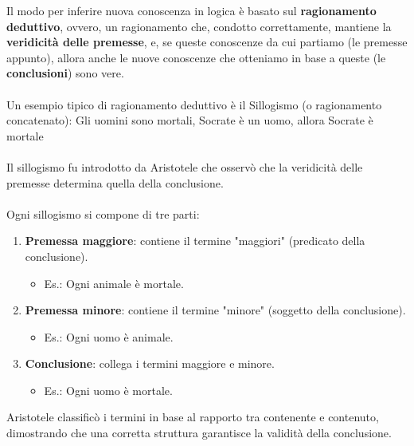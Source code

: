 \documentclass[../main.tex]{subfiles}
\begin{document}
	Il modo per inferire nuova conoscenza in logica è basato sul \textbf{ragionamento deduttivo}, ovvero, un ragionamento che, condotto correttamente, mantiene la \textbf{veridicità delle premesse}, e, se queste conoscenze da cui partiamo (le premesse appunto), allora anche le nuove conoscenze che otteniamo in base a queste (le \textbf{conclusioni}) sono vere.\\\\
	Un esempio tipico di ragionamento deduttivo è il Sillogismo (o ragionamento concatenato): Gli uomini sono mortali, Socrate è un uomo, allora Socrate è mortale\\\\
	Il sillogismo fu introdotto da Aristotele che osservò che la veridicità delle premesse determina quella della conclusione.\\\\
	Ogni sillogismo si compone di tre parti:
	\begin{enumerate}
		\item \textbf{Premessa maggiore}: contiene il termine "maggiori" (predicato della conclusione).
		\begin{itemize}
			\item Es.: Ogni animale è mortale.
		\end{itemize}
		\item \textbf{Premessa minore}: contiene il termine "minore" (soggetto della conclusione).
		\begin{itemize}
			\item Es.: Ogni uomo è animale.
		\end{itemize}
		\item \textbf{Conclusione}: collega i termini maggiore e minore.
		\begin{itemize}
			\item Es.: Ogni uomo è mortale.
		\end{itemize}
	\end{enumerate}
	Aristotele classificò i termini in base al rapporto tra contenente e contenuto, dimostrando che una corretta struttura garantisce la validità della conclusione.
\end{document}
